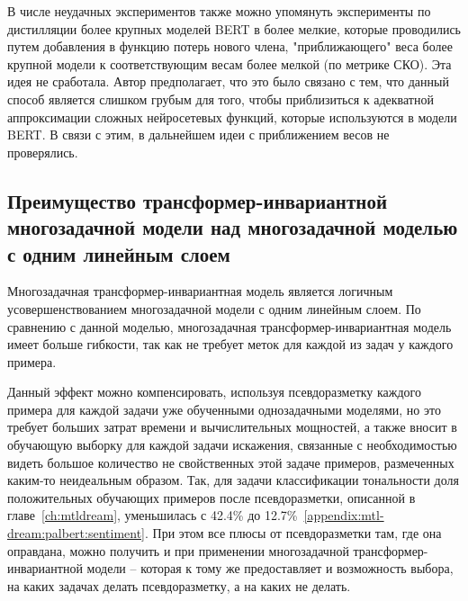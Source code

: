 В числе неудачных экспериментов также можно упомянуть эксперименты по дистилляции более крупных моделей BERT в более мелкие, которые проводились путем добавления в функцию потерь нового члена, "приближающего" веса более крупной модели к соответствующим весам более мелкой (по метрике СКО). Эта идея не сработала. Автор предполагает, что это было связано с тем, что данный способ является слишком грубым для того, чтобы приблизиться к адекватной аппроксимации сложных нейросетевых функций, которые используются в модели BERT. В связи с этим, в дальнейшем идеи с приближением весов не проверялись. 
\subsection{Преимущество трансформер-инвариантной многозадачной модели над многозадачной моделью с одним линейным слоем}
\label{ch:tr-ag:advantages}

Многозадачная трансформер-инвариантная модель является логичным усовершенствованием многозадачной модели с одним линейным слоем. По сравнению с данной моделью, многозадачная трансформер-инвариантная модель имеет больше гибкости, так как не требует меток для каждой из задач у каждого примера. %

Данный эффект можно компенсировать, используя псевдоразметку каждого примера для каждой задачи уже обученными однозадачными моделями, но это требует больших затрат времени и вычислительных мощностей, а также вносит в обучающую выборку для каждой задачи искажения, связанные с необходимостью видеть большое количество не свойственных этой задаче примеров, размеченных каким-то неидеальным образом. Так, для задачи классификации тональности доля положительных обучающих примеров после псевдоразметки, описанной в главе~\ref{ch:mtldream}, уменьшилась с 42.4\% до 12.7\%~\ref{appendix:mtl-dream:palbert:sentiment}. При этом все плюсы от псевдоразметки там, где она оправдана, можно получить и при применении многозадачной трансформер-инвариантной модели -- которая к тому же предоставляет и возможность выбора, на каких задачах делать псевдоразметку, а на каких не делать.

